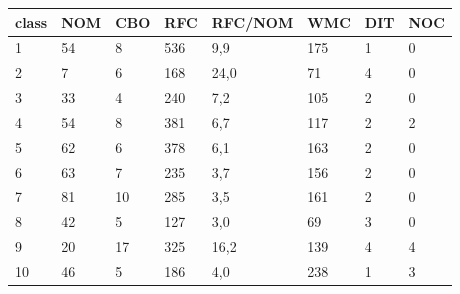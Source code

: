\documentclass[a4paper,titlepage]{artikel1}
\begin{document}
\begin{itemize}
\begin{center}
\begin{tabular}{|l|l|l|l|l|l|l|l|}
         class & NOM & CBO & RFC & RFC/NOM & WMC & DIT & NOC \\
         \hline
         1 & 54 & 8 & 536 & 9,9 & 175 & 1 & 0 \\
         2 & 7 & 6 & 168 & 24,0 & 71 & 4 & 0 \\
         3 & 33 & 4 & 240 & 7,2 & 105 & 2 & 0 \\
         4 & 54 & 8 & 381 & 6,7& 117 & 2 & 2 \\
         5 & 62 & 6 & 378 & 6,1 & 163 & 2 & 0 \\
         6 & 63 & 7 & 235 & 3,7 & 156 & 2 & 0 \\
         7 & 81 & 10  & 285 & 3,5 & 161 & 2 & 0 \\
         8 & 42 & 5 & 127 & 3,0 & 69 & 3 & 0 \\
         9 & 20 & 17 & 325 & 16,2 & 139 & 4 & 4 \\
         10 & 46 & 5 & 186 & 4,0 & 238 & 1 & 3 \\
         \hline
       \end{tabular}
       \end{center}
       

\end{itemize}
\end{document}
